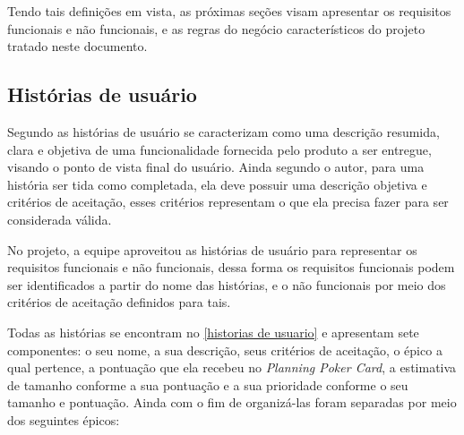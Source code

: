 Tendo tais definições em vista, as próximas seções visam apresentar os requisitos funcionais e não funcionais, e as regras do negócio característicos do projeto tratado neste documento. 

\subsection{Histórias de usuário}
Segundo  as histórias de usuário se caracterizam como uma descrição resumida, clara e objetiva de uma funcionalidade fornecida pelo produto a ser entregue, visando o ponto de vista final do usuário. Ainda segundo o autor, para uma história ser tida como completada, ela deve possuir uma descrição objetiva e critérios de aceitação, esses critérios representam o que ela precisa fazer para ser considerada válida.

No projeto, a equipe aproveitou as histórias de usuário para representar os requisitos funcionais e não funcionais, dessa forma os requisitos funcionais podem ser identificados a partir do nome das histórias, e o não funcionais por meio dos critérios de aceitação definidos para tais.

Todas as histórias se encontram no \autoref{historias de usuario} e apresentam sete componentes: o seu nome, a sua descrição, seus critérios de aceitação, o épico a qual pertence, a pontuação que ela recebeu no \textsl{Planning Poker Card}, a estimativa de tamanho conforme a sua pontuação e a sua prioridade conforme o seu tamanho e pontuação. Ainda com o fim de organizá-las foram separadas por meio dos seguintes épicos:

